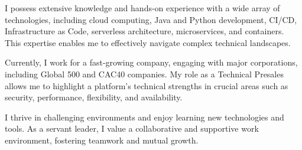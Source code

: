 

\begin{cvparagraph}

I possess extensive knowledge and hands-on experience with a wide array of technologies, including cloud computing, Java and Python development, CI/CD, Infrastructure as Code, serverless architecture, microservices, and containers. This expertise enables me to effectively navigate complex technical landscapes.

Currently, I work for a fast-growing company, engaging with major corporations, including Global 500 and CAC40 companies. My role as a Technical Presales allows me to highlight a platform's technical strengths in crucial areas such as security, performance, flexibility, and availability.

I thrive in challenging environments and enjoy learning new technologies and tools. As a servant leader, I value a collaborative and supportive work environment, fostering teamwork and mutual growth.
\end{cvparagraph}

